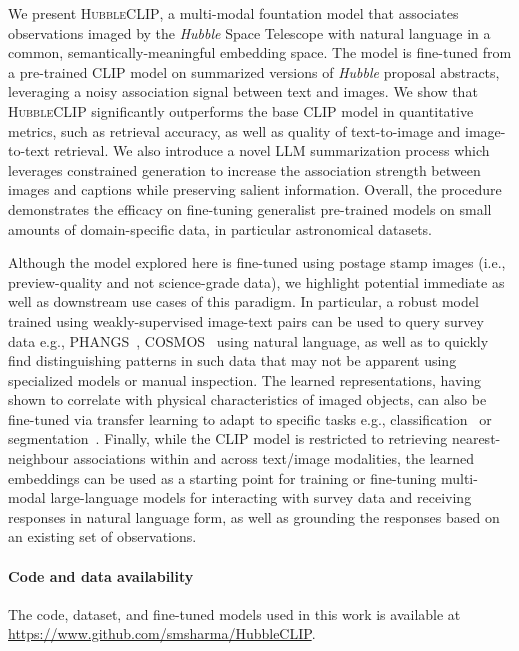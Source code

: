 \documentclass[10pt]{article} %
\newcommand{\hubble}{\emph{Hubble}\xspace}
\begin{document}
We present \textsc{HubbleCLIP}, a multi-modal fountation model that associates observations imaged by the \hubble Space Telescope with natural language in a common, semantically-meaningful embedding space.
%
The model is fine-tuned from a pre-trained CLIP model on summarized versions of \hubble proposal abstracts, leveraging a noisy association signal between text and images.
%
We show that \textsc{HubbleCLIP} significantly outperforms the base CLIP model in quantitative metrics, such as retrieval accuracy, as well as quality of text-to-image and image-to-text retrieval.
%
We also introduce a novel LLM summarization process which leverages constrained generation to increase the association strength between images and captions while preserving salient information.
%
Overall, the procedure demonstrates the efficacy on fine-tuning generalist pre-trained models on small amounts of domain-specific data, in particular astronomical datasets.

Although the model explored here is fine-tuned using postage stamp images (i.e., preview-quality and not science-grade data), we highlight potential immediate as well as downstream use cases of this paradigm.
%
In particular, a robust model trained using weakly-supervised image-text pairs can be used to query survey data e.g., PHANGS~\citep{lee2022phangs}, COSMOS~\citep{scoville2007cosmic} using natural language, as well as to quickly find distinguishing patterns in such data that may not be apparent using specialized models or manual inspection.
%
The learned representations, having shown to correlate with physical characteristics of imaged objects, can also be fine-tuned via transfer learning to adapt to specific tasks e.g., classification~\citep{wei2020deep} or segmentation~\citep{hausen2020morpheus}.
%
Finally, while the CLIP model is restricted to retrieving nearest-neighbour associations within and across text/image modalities, the learned embeddings can be used as a starting point for training or fine-tuning multi-modal large-language models for interacting with survey data and receiving responses in natural language form, as well as grounding the responses based on an existing set of observations.

\paragraph*{Code and data availability}

The code, dataset, and fine-tuned models used in this work is available at \url{https://www.github.com/smsharma/HubbleCLIP}.
\end{document}
